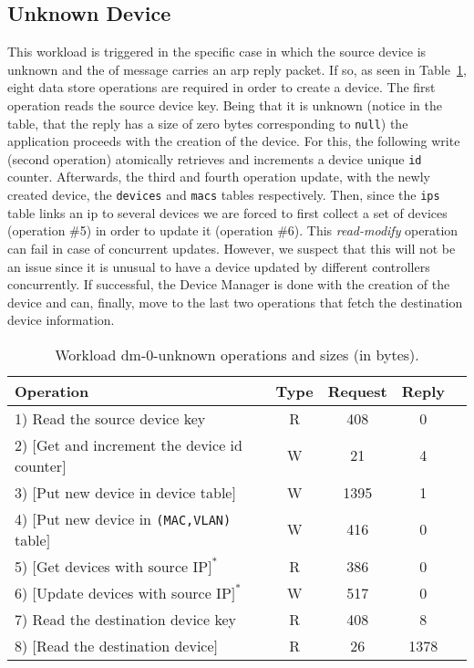\subsection{Unknown Device}
This workload is triggered in the specific case in which  the source device is unknown and the \gls{of} message carries an \gls{arp} reply 
packet. 
If so, as seen in Table~\ref{table:ops:dm-0-unknown},  eight data store operations are required in order to create a device.  
The first operation reads the  source device key.  
Being that it is unknown (notice in the table, that the reply has a size  of zero bytes corresponding to \texttt{null}) the application proceeds with the creation of the device. 
For this, the following write (second operation) atomically retrieves and increments a device unique \texttt{id} counter. 
Afterwards, the third and fourth  operation update, with the newly created device, the \texttt{devices} and \texttt{macs} tables respectively. 
Then, since the \texttt{ips} table links an \gls{ip} to several devices we are forced to first collect a set of devices  (operation \#5) in order to update it (operation \#6).  
This \emph{read-modify} operation can fail in case of concurrent updates.
However, we suspect that this will not be an issue since it is unusual to have a device updated by different controllers concurrently.
If successful, the Device Manager is done with the creation of the device and can, finally, move to the last two operations that fetch the destination device information.
 
\begin{table}[H]
\small
\centering 
\begin{tabular}{l c c c c}
Operation & Type & Request & Reply \\ \toprule 
1) Read the source device key & R & 408 & 0\\
2) $[$Get and increment the device id counter$]$ & W & 21 & 4\\
3) $[$Put new device in device table$]$ & W & 1395 & 1\\
4) $[$Put new device in \texttt{(MAC,VLAN)} table$]$ & W & 416 & 0\\
5) $[$Get devices with source IP$]^*$ & R & 386 & 0\\
6) $[$Update devices with source IP$]^*$ & W & 517 & 0\\
7) Read the destination device key & R & 408 & 8\\
8) $[$Read the destination device$]$ & R & 26 & 1378 \\\bottomrule
\end{tabular}
\caption[Workload dm-0-unknown operations]{Workload dm-0-unknown operations
  and sizes (in bytes).}
\label{table:ops:dm-0-unknown}
\end{table}


